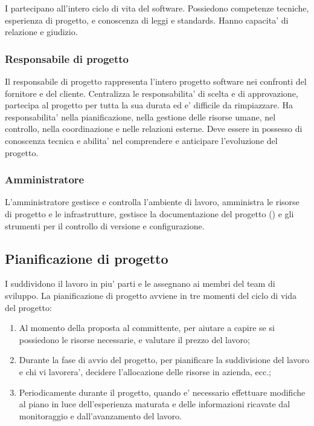 I  partecipano all'intero ciclo di vita del software.
Possiedono competenze tecniche, esperienza di progetto, e conoscenza di leggi e
standards. Hanno capacita' di relazione e giudizio.

\subsubsection{Responsabile di progetto}

Il responsabile di progetto rappresenta l'intero progetto software nei confronti
del fornitore e del cliente. Centralizza le responsabilita' di scelta e di
approvazione, partecipa al progetto per tutta la sua durata ed e' difficile da
rimpiazzare. Ha responsabilita' nella pianificazione, nella gestione delle
risorse umane, nel controllo, nella coordinazione e nelle relazioni esterne.
Deve essere in possesso di conoscenza tecnica e abilita' nel comprendere e
anticipare l'evoluzione del progetto.

\subsubsection{Amministratore}

L'amministratore gestisce e controlla l'ambiente di lavoro, amministra le
risorse di progetto e le infrastrutture, gestisce la documentazione del progetto
() e gli strumenti per il controllo di versione e
configurazione.

\subsection{Pianificazione di progetto}

I  suddividono il lavoro in piu' parti e le assegnano
ai membri del team di sviluppo. La pianificazione di progetto avviene in tre
momenti del ciclo di vida del progetto:

\begin{enumerate}
  \item Al momento della proposta al committente, per aiutare a capire se si
    possiedono le risorse necessarie, e valutare il prezzo del lavoro;
  \item Durante la fase di avvio del progetto, per pianificare la suddivisione
    del lavoro e chi vi lavorera', decidere l'allocazione delle risorse in
    azienda, ecc.;
  \item Periodicamente durante il progetto, quando e' necessario effettuare
    modifiche al piano in luce dell'esperienza maturata e delle informazioni
    ricavate dal monitoraggio e dall'avanzamento del lavoro.
\end{enumerate}

